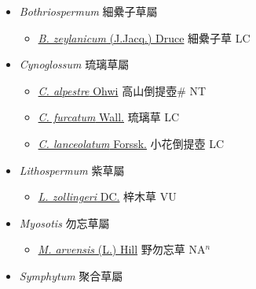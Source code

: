 
  \begin{itemize}
 \item[] \textit{Bothriospermum} 細纍子草屬
                    
  \begin{itemize}
        \item[] \href{http://www.theplantlist.org/tpl1.1/search?q=Bothriospermum+zeylanicum}{\textit{B. zeylanicum} (J.Jacq.) Druce}   細纍子草 LC
  \end{itemize}
 \item[] \textit{Cynoglossum} 琉璃草屬
                    
  \begin{itemize}
        \item[] \href{http://www.theplantlist.org/tpl1.1/search?q=Cynoglossum+alpestre}{\textit{C. alpestre} Ohwi}   高山倒提壺\# NT
        \item[] \href{http://www.theplantlist.org/tpl1.1/search?q=Cynoglossum+furcatum}{\textit{C. furcatum} Wall.}   琉璃草 LC
        \item[] \href{http://www.theplantlist.org/tpl1.1/search?q=Cynoglossum+lanceolatum}{\textit{C. lanceolatum} Forssk.}   小花倒提壺 LC
  \end{itemize}
 \item[] \textit{Lithospermum} 紫草屬
                    
  \begin{itemize}
        \item[] \href{http://www.theplantlist.org/tpl1.1/search?q=Lithospermum+zollingeri}{\textit{L. zollingeri} DC.}   梓木草 VU
  \end{itemize}
 \item[] \textit{Myosotis} 勿忘草屬
                    
  \begin{itemize}
        \item[] \href{http://www.theplantlist.org/tpl1.1/search?q=Myosotis+arvensis}{\textit{M. arvensis} (L.) Hill}   野勿忘草 NA$^n$
  \end{itemize}
 \item[] \textit{Symphytum} 聚合草屬
                    

\end{itemize}
